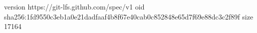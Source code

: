 version https://git-lfs.github.com/spec/v1
oid sha256:1fd9550c3eb1a0e21dadfaaf4b8f67e40cab0c852848e65d7f69e88dc3c2f89f
size 17164

